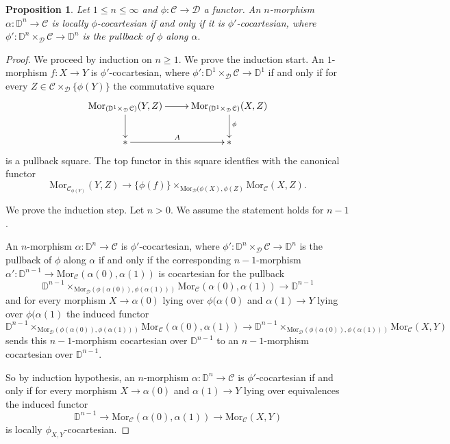 \documentclass[10pt,oneside]{article}
\numberwithin{equation}{section} %
\numberwithin{figure}{section} %
\theoremstyle{plain}
\newtheorem{proposition}[theorem]{Proposition}
\theoremstyle{definition}
\newcommand{\bD}{{\mathbb D}}
\newcommand{\mC}{{\mathcal C}}
\newcommand{\mD}{{\mathcal D}}
\newcommand{\n}{{n}}
\newcommand{\Mor}{{\mathrm{Mor}}}
\begin{document}
\begin{proposition}\label{loccharto}
Let $1 \leq \n \leq \infty$ and $\phi: \mC \to \mD$ a functor.
An $n$-morphism $\alpha:\bD^n\to\mC$ is locally $\phi$-cocartesian if and only if it is $\phi'$-cocartesian, where $\phi': \bD^n \times_\mD \mC \to \bD^n$ is the pullback of $\phi$ along $\alpha.$ 

\end{proposition}

\begin{proof}

We proceed by induction on $n \geq 1.$
We prove the induction start.
An $1$-morphism $f:X \to Y$ is $\phi'$-cocartesian, where $\phi': \bD^1 \times_\mD \mC \to \bD^1$ if and only if for every $Z \in \mC \times_\mD \{ \phi(Y) \} $ the commutative square 
\begin{equation}\label{filler5}
\begin{xy}
\xymatrix{
\Mor_{(\bD^1 \times_\mD \mC)}(Y,Z) \ar[d] \ar[r]
& \Mor_{(\bD^1 \times_\mD \mC)}(X,Z) \ar[d]^\phi
\\ 
\ast \ar[r]^{A} & \ast
}
\end{xy}\end{equation}
is a pullback square.
The top functor in this square identfies with the canonical functor
$$ \Mor_{\mC_{\phi(Y)}}(Y,Z) \to \{ \phi(f) \}\times_{\Mor_\mD(\phi(X), \phi(Z)} \Mor_\mC(X,Z).$$

We prove the induction step. Let $n > 0$. We assume the statement holds for $n-1$.

An $n$-morphism $\alpha:\bD^n\to\mC$ is $\phi'$-cocartesian, where $\phi': \bD^n \times_\mD \mC \to \bD^n$ is the pullback of $\phi$ along $\alpha$ if and only if the corresponding $n-1$-morphism $\alpha':\bD^{n-1}\to \Mor_\mC(\alpha(0),\alpha(1))$ is cocartesian for the pullback
$$\bD^{n-1} \times_{\Mor_\mD(\phi(\alpha(0)),\phi(\alpha(1)))} \Mor_\mC(\alpha(0),\alpha(1)) \to \bD^{n-1}$$
and for every morphism
$X \to \alpha(0)$ lying over $\phi(\alpha(0)$ and $\alpha(1) \to Y$ lying over $\phi(\alpha(1)$ the induced functor
$$\bD^{n-1} \times_{\Mor_\mD(\phi(\alpha(0)),\phi(\alpha(1)))} \Mor_\mC(\alpha(0),\alpha(1)) \to \bD^{n-1} \times_{\Mor_\mD(\phi(\alpha(0)),\phi(\alpha(1)))} \Mor_\mC(X,Y)$$
sends this $n-1$-morphism cocartesian over $\bD^{n-1}$ to an $n-1$-morphism cocartesian over $\bD^{n-1}$. 

So by induction hypothesis, an $n$-morphism $\alpha:\bD^n\to\mC$ is $\phi'$-cocartesian if and only if for every morphism
$X \to \alpha(0)$ and $\alpha(1) \to Y$ lying over equivalences the induced functor
$$\bD^{n-1} \to \Mor_\mC(\alpha(0),\alpha(1)) \to \Mor_\mC(X,Y) $$
is locally $\phi_{X,Y}$-cocartesian.  
\end{proof}
\end{document}
